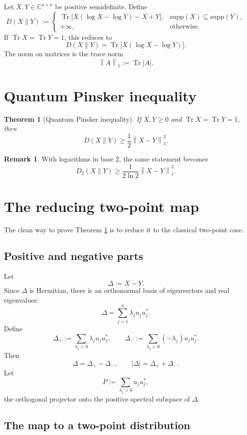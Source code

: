 \documentclass[11pt]{article}
\newtheorem{theorem}{Theorem}
\theoremstyle{definition}
\newtheorem{remark}{Remark}
\DeclareMathOperator{\Tr}{Tr}
\newcommand{\1}{\mathbf{1}}
\newcommand{\norm}[1]{\left\lVert #1 \right\rVert}
\newcommand{\supp}{\mathrm{supp}}
\begin{document}
Let $X,Y\in \mathbb{C}^{n\times n}$ be positive semidefinite. Define
\[
D(X\|Y):=
\begin{cases}
\Tr\!\bigl[X(\log X-\log Y)-X+Y\bigr], & \supp(X)\subseteq \supp(Y),\\[0.4em]
+\infty, & \text{otherwise.}
\end{cases}
\]
If $\Tr X=\Tr Y=1$, this reduces to
\[
D(X\|Y)=\Tr\!\bigl[X(\log X-\log Y)\bigr].
\]
The norm on matrices is the trace norm
\[
\norm{A}_1:=\Tr|A|.
\]

\section{Quantum Pinsker inequality}

\begin{theorem}[Quantum Pinsker inequality]\label{thm:quantum-pinsker}
If $X,Y\ge 0$ and $\Tr X=\Tr Y=1$, then
\begin{equation}\label{eq:quantum-pinsker}
D(X\|Y)\ge \frac12 \norm{X-Y}_1^2.
\end{equation}
\end{theorem}

\begin{remark}
With logarithms in base $2$, the same statement becomes
\[
D_2(X\|Y)\ge \frac{1}{2\ln 2}\norm{X-Y}_1^2.
\]
\end{remark}

\section{The reducing two-point map}

The clean way to prove Theorem \ref{thm:quantum-pinsker} is to reduce it to the classical two-point case.

\subsection{Positive and negative parts}

Let
\[
\Delta:=X-Y.
\]
Since $\Delta$ is Hermitian, there is an orthonormal basis of eigenvectors and real eigenvalues:
\[
\Delta=\sum_{j=1}^n \lambda_j u_j u_j^\ast.
\]
Define
\[
\Delta_+:=\sum_{\lambda_j>0}\lambda_j u_j u_j^\ast,
\qquad
\Delta_-:=\sum_{\lambda_j<0}(-\lambda_j) u_j u_j^\ast.
\]
Then
\[
\Delta=\Delta_+-\Delta_-,
\qquad
|\Delta|=\Delta_++\Delta_-.
\]
Let
\[
P:=\sum_{\lambda_j>0}u_j u_j^\ast,
\]
the orthogonal projector onto the positive spectral subspace of $\Delta$.

\subsection{The map to a two-point distribution}
\end{document}

